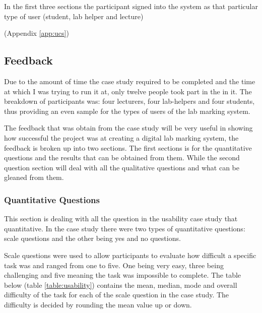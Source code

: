 \documentclass[12pt]{article}  %
\begin{document}
In the first three sections the participant signed into the system as that particular type of user (student, lab helper and lecture) 



(Appendix \ref{app:ucs})

\subsection{Feedback}

Due to the amount of time the case study required to be completed and the time at which I was trying to run it at, only twelve people took part in the in it. The breakdown of participants was: four lecturers, four lab-helpers and four students, thus providing an even sample for the types of users of the lab marking system.

The feedback that was obtain from the case study will be very useful in showing how successful the project was at creating a digital lab marking system, the feedback is broken up into two sections. The first sections is for the quantitative questions and the results that can be obtained from them. While the second question section will deal with all the qualitative questions and what can be gleaned from them. 



\subsubsection{Quantitative Questions}

This section is dealing with all the question in the usability case study that quantitative. In the case study there were two types of quantitative questions: scale questions and the other being  yes and no questions.

Scale questions were used to allow participants to evaluate how difficult a specific task was and ranged from one to five. One being very easy, three being challenging and five meaning the task was impossible to complete. 
The table below (table \ref{table:usability}) contains the mean, median, mode and overall difficulty of the task for each of the scale question in the case study. The difficulty is decided by rounding the mean value up or down.

\setlength\LTleft{0pt}
\setlength\LTright{0pt}
\end{document}
